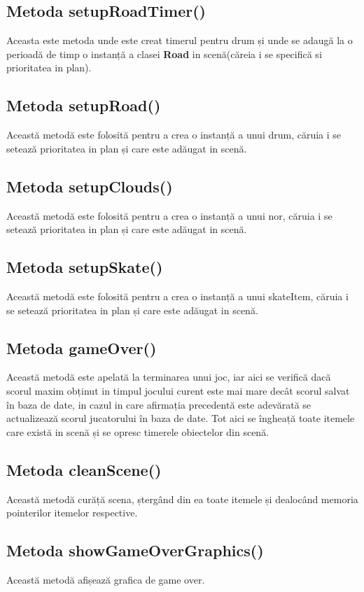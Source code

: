 \documentclass{article}
\begin{document}
\subsection{Metoda setupRoadTimer()}
Aceasta este metoda unde este creat timerul pentru drum și unde se adaugă  la o perioadă de timp o instanță a clasei \textbf{Road}  in scenă(căreia i se specifică si prioritatea in plan).

\subsection{Metoda setupRoad()}
Această metodă este folosită pentru a crea o instanță a unui drum, căruia i se setează prioritatea in plan și care este adăugat in scenă.

\subsection{Metoda setupClouds()}
Această metodă este folosită pentru a crea o instanță a unui nor, căruia i se setează prioritatea in plan și care este adăugat in scenă.

\subsection{Metoda setupSkate()}
Această metodă este folosită pentru a crea o instanță a unui skateItem, căruia i se setează prioritatea in plan și care este adăugat in scenă.

\subsection{Metoda gameOver()}
Această metodă este apelată la terminarea unui joc, iar aici se verifică dacă scorul maxim obținut in timpul jocului curent este mai mare decât scorul salvat în baza de date, in cazul in care afirmația precedentă este adevărată se actualizează scorul jucatorului în baza de date. Tot aici se îngheață toate itemele care există in scenă și se opresc timerele obiectelor din scenă.


\subsection{Metoda cleanScene()}
Această metodă curăță scena, ștergând din ea toate itemele și dealocând memoria pointerilor itemelor respective.

\subsection{Metoda showGameOverGraphics()}
Această metodă afișează grafica de game over.
\end{document}
